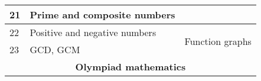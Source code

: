 \documentclass[a4paper]{article}
\begin{document}
\begin{center}
\begin{table}[]
\begin{tabular}{|lll|}
    \multicolumn{1}{|l|}{21} & \multicolumn{1}{l|}{Prime and composite numbers}       &                                              \\ \hline
    \multicolumn{1}{|l|}{22} & \multicolumn{1}{l|}{Positive and negative numbers}     & \multirow{2}{*}{Function graphs}             \\ \cline{1-2}
    \multicolumn{1}{|l|}{23} & \multicolumn{1}{l|}{GCD, GCM}                          &                                              \\ \hline
    \multicolumn{3}{|c|}{\textbf{Olympiad mathematics}}                                                                              \\ \hline
    \end{tabular}
    \end{table}

\end{center}
\end{document}
